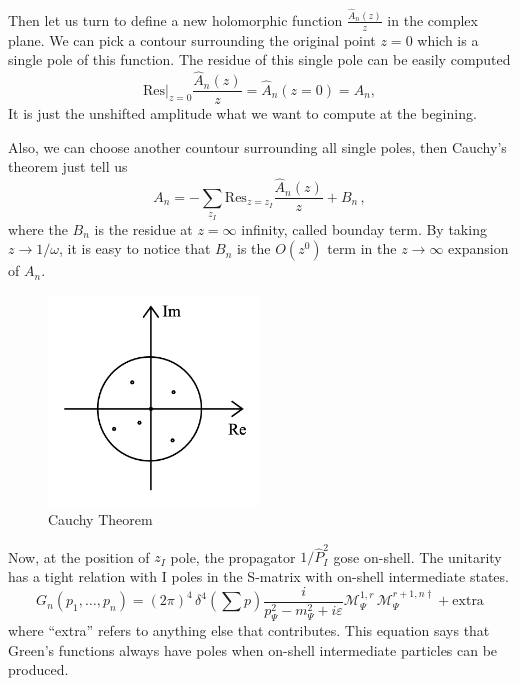 \documentclass[12pt]{article}
\numberwithin{equation}{section}
\begin{document}
Then let us turn to define a new holomorphic function $\frac{\hat{A}_n(z)}{z}$ in the complex plane. We can pick a contour surrounding the original point 
$z=0$ which is a single pole of this function. The residue of this single pole can be easily computed
\begin{equation}
    \mathrm{Res}|_{z=0}\frac{\hat{A}_n(z)}{z}=\hat{A}_n(z=0)=A_n,
\end{equation}
It is just the unshifted amplitude what we want to compute at the begining. 

Also, we can choose another countour surrounding all single poles, then Cauchy's theorem just tell us 
\begin{equation}
    A_n = - \sum_{z_I} \mathrm{Res}_{z=z_I} \frac{\hat{A}_n(z)}{z}  + B_n\,,
\end{equation}
where the $B_n$ is the residue at $z=\infty$ infinity, called bounday term. By taking $z\rightarrow 1/\omega$, it is easy to notice that
$B_n$ is the $O(z^0)$ term in the $z\rightarrow \infty$ expansion of $A_n$.

\begin{figure}[htbp]
    \centering
    \includegraphics[width=0.5\textwidth]{Cau.png} %
    \caption{Cauchy Theorem}
\end{figure}

Now, at the position of $z_I$ pole, the propagator $1/\hat{P}_I^2$ gose on-shell. The unitarity has a tight relation with I poles in the S-matrix with on-shell intermediate
states.
\begin{equation}
    G_n(p_1, \ldots, p_n) = (2\pi)^4 \, \delta^4\left(\sum p\right) 
\frac{i}{p_\Psi^2 - m_\Psi^2 + i\varepsilon} 
\mathcal{M}_\Psi^{1,r} \, \mathcal{M}_\Psi^{r+1,n\dagger} + \text{extra}
\end{equation}
where “extra” refers to anything else that contributes. This equation says that Green’s
functions always have poles when on-shell intermediate particles can be produced. 
\end{document}
